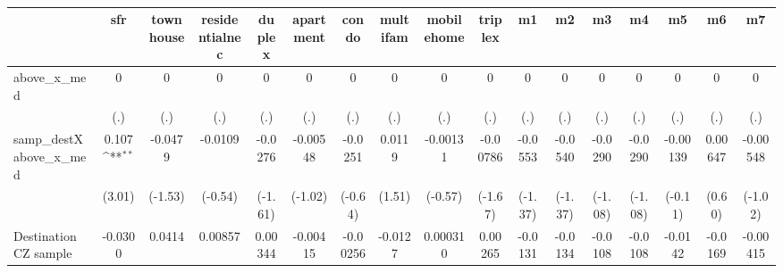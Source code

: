 \begin{table}[htbp]\centering
\def\sym#1{\ifmmode^{#1}\else\(^{#1}\)\fi}
\caption{ \label{tab1}}
\begin{tabular}{l*{16}{c}}
\toprule
                    &\multicolumn{1}{c}{sfr}&\multicolumn{1}{c}{townhouse}&\multicolumn{1}{c}{residentialnec}&\multicolumn{1}{c}{duplex}&\multicolumn{1}{c}{apartment}&\multicolumn{1}{c}{condo}&\multicolumn{1}{c}{multifam}&\multicolumn{1}{c}{mobilehome}&\multicolumn{1}{c}{triplex}&\multicolumn{1}{c}{m1}&\multicolumn{1}{c}{m2}&\multicolumn{1}{c}{m3}&\multicolumn{1}{c}{m4}&\multicolumn{1}{c}{m5}&\multicolumn{1}{c}{m6}&\multicolumn{1}{c}{m7}\\
\midrule
above\_x\_med         &           0         &           0         &           0         &           0         &           0         &           0         &           0         &           0         &           0         &           0         &           0         &           0         &           0         &           0         &           0         &           0         \\
                    &         (.)         &         (.)         &         (.)         &         (.)         &         (.)         &         (.)         &         (.)         &         (.)         &         (.)         &         (.)         &         (.)         &         (.)         &         (.)         &         (.)         &         (.)         &         (.)         \\
\addlinespace
samp\_destXabove\_x\_med&       0.107\sym{**} &     -0.0479         &     -0.0109         &     -0.0276         &    -0.00548         &     -0.0251         &      0.0119         &    -0.00131         &    -0.00786         &     -0.0553         &     -0.0540         &     -0.0290         &     -0.0290         &    -0.00139         &     0.00647         &    -0.00548         \\
                    &      (3.01)         &     (-1.53)         &     (-0.54)         &     (-1.61)         &     (-1.02)         &     (-0.64)         &      (1.51)         &     (-0.57)         &     (-1.67)         &     (-1.37)         &     (-1.37)         &     (-1.08)         &     (-1.08)         &     (-0.11)         &      (0.60)         &     (-1.02)         \\
\addlinespace
Destination CZ sample&     -0.0300         &      0.0414         &     0.00857         &     0.00344         &    -0.00415         &    -0.00256         &     -0.0127         &    0.000310         &     0.00265         &     -0.0131         &     -0.0134         &     -0.0108         &     -0.0108         &     -0.0142         &     -0.0169         &    -0.00415         \\

\end{tabular}
\end{table}

